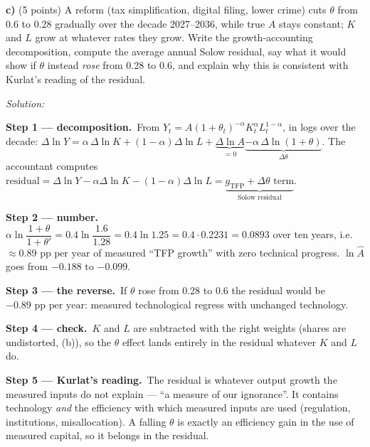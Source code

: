 \documentclass[11pt,a4paper]{article}
\newif\ifsolucoes
\newcommand{\espacoresol}{6.5cm}
\newcommand{\resolespaco}{\ifsolucoes\else\par\textit{Solution:}\vspace{\espacoresol}\par\fi}
\newcommand{\passo}[2]{\par\smallskip\noindent\textbf{Step #1.}~#2}
\begin{document}
\textbf{c)} (5 points) A reform (tax simplification, digital filing, lower crime) cuts $\theta$ from
0.6 to 0.28 gradually over the decade 2027--2036, while true $A$ stays constant; $K$ and $L$ grow at
whatever rates they grow. Write the growth-accounting decomposition, compute the average annual Solow
residual, say what it would show if $\theta$ instead \emph{rose} from 0.28 to 0.6, and explain why
this is consistent with Kurlat's reading of the residual.
\resolespaco
\begin{sol}
\passo{1 --- decomposition}{From $Y_t=A(1+\theta_t)^{-\alpha}K_t^{\alpha}L_t^{1-\alpha}$, in logs over the decade:
$\Delta\ln Y=\alpha\,\Delta\ln K+(1-\alpha)\Delta\ln L+\underbrace{\Delta\ln A}_{=0}\underbrace{-\alpha\,\Delta\ln(1+\theta)}_{\Delta\theta}$.
The accountant computes $\text{residual}=\Delta\ln Y-\alpha\Delta\ln K-(1-\alpha)\Delta\ln L=\underbrace{g_{\text{TFP}}+\Delta\theta\text{ term}}_{\text{Solow residual}}$.}
\passo{2 --- number}{$\alpha\ln\dfrac{1+\theta}{1+\theta'}=0.4\ln\dfrac{1.6}{1.28}=0.4\ln1.25=0.4\cdot0.2231=0.0893$
over ten years, i.e.\ $\boxed{\approx0.89\text{ pp per year}}$ of measured ``TFP growth'' with zero
technical progress. $\ln\hat A$ goes from $-0.188$ to $-0.099$.}
\passo{3 --- the reverse}{If $\theta$ rose from 0.28 to 0.6 the residual would be
$\boxed{-0.89\text{ pp per year}}$: measured technological regress with unchanged technology.}
\passo{4 --- check}{$K$ and $L$ are subtracted with the right weights (shares are undistorted, (b)),
so the $\theta$ effect lands entirely in the residual whatever $K$ and $L$ do.}
\passo{5 --- Kurlat's reading}{The residual is whatever output growth the measured inputs do not
explain --- ``a measure of our ignorance''. It contains technology \emph{and} the efficiency with which
measured inputs are used (regulation, institutions, misallocation). A falling $\theta$ is exactly an
efficiency gain in the use of measured capital, so it belongs in the residual.}
\begin{center}
\end{center}
\end{sol}
\end{document}
